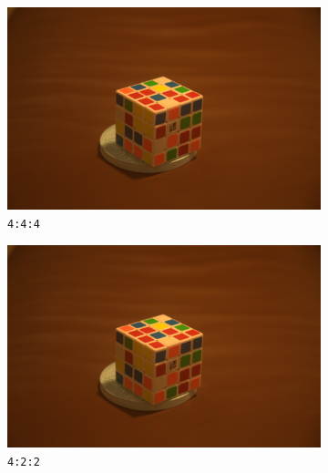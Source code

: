 \documentclass{article}
\begin{document}
\begin{figure}[h!]
\centering
\begin{subfigure}[b]{0.4\textwidth}
\caption{\texttt{4:4:4}}
\begin{center}
	\includegraphics[width=\textwidth]{./implementation/experiment/out.png}
\end{center}
\end{subfigure}
\begin{subfigure}[b]{0.4\textwidth}
\caption{\texttt{4:2:2}}
\begin{center}
	\includegraphics[width=\textwidth]{./implementation/experiment/422.png}
\end{center}
\end{subfigure}
\begin{subfigure}[b]{0.4\textwidth}
\begin{center}

\end{center}
\end{subfigure}
\end{figure}
\end{document}

